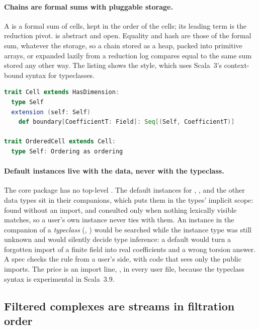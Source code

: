 \paragraph{Chains are formal sums with pluggable storage.}
A  is a formal sum of cells, kept in the order of the cells; its leading term is the
reduction pivot.  is abstract and open. Equality and hash are those of the formal sum, whatever the storage, so a
chain stored as a heap, packed into primitive arrays, or expanded lazily from a reduction log compares equal to the same sum
stored any other way. The listing shows the style, which uses Scala~3's context-bound syntax for typeclasses.

\begin{lstlisting}[language=Scala]
trait Cell extends HasDimension:
  type Self
  extension (self: Self)
    def boundary[CoefficientT: Field]: Seq[(Self, CoefficientT)]

trait OrderedCell extends Cell:
  type Self: Ordering as ordering
\end{lstlisting}

\paragraph{Default instances live with the data, never with the typeclass.}
The core package has no top-level . The default instances for , ,  and the
other data types sit in their companions, which puts them in the types' implicit scope: found without an import, and
consulted only when nothing lexically visible matches, so a user's own instance never ties with them. An instance in the
companion of a \emph{typeclass} (, ) would be searched while the instance type was still
unknown and would silently decide type inference: a default  would turn a forgotten import of a
finite field into real coefficients and a wrong torsion answer. A spec checks the rule from a user's side, with code
that sees only the public imports. The price is an import line, ,
in every user file, because the typeclass syntax is experimental in Scala~3.9.

\subsection{Filtered complexes are streams in filtration order}\label{sec:streams}

